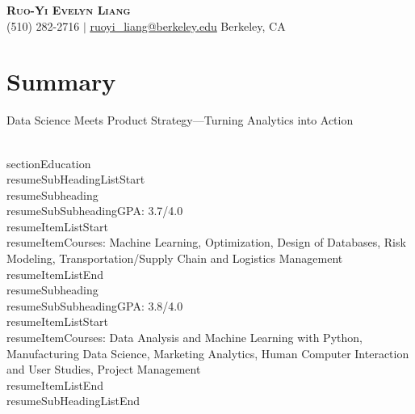 \documentclass[letterpaper,11pt]{article}
\makeatletter
\newcommand{\resumeItem}[1]{
  \item\small{
    {#1 \vspace{-2pt}}
  }
}
\newcommand{\resumeSubheading}[4]{
  \vspace{-2pt}\item
    \begin{tabular*}{0.97\textwidth}[t]{l@{\extracolsep{\fill}}r}
      \textbf{#1} & #2 \\
      \textit{\small#3} & \textit{\small #4} \\
    \end{tabular*}\vspace{-7pt}
}
\newcommand{\resumeSubSubheading}[2]{
    \item
    \begin{tabular*}{0.97\textwidth}{l@{\extracolsep{\fill}}r}
      \textit{\small#1} & \textit{\small #2} \\
    \end{tabular*}\vspace{-7pt}
}
\newcommand{\resumeSubHeadingListStart}{\begin{itemize}[leftmargin=0.15in, label={}]}
\newcommand{\resumeSubHeadingListEnd}{\end{itemize}}
\newcommand{\resumeItemListStart}{\begin{itemize}}
\newcommand{\resumeItemListEnd}{\end{itemize}\vspace{-5pt}}
\makeatother
\begin{document}
\setlength{\pdfpageheight}{11.00in}

\begin{center}
    \textbf{\Huge \scshape Ruo-Yi Evelyn Liang} \\ \vspace{1pt}
    \small (510) 282-2716 $|$ \href{mailto:ruoyi_liang@berkeley.edu}{\underline{ruoyi\_liang@berkeley.edu}}
    \small Berkeley, CA
\end{center}

\section*{Summary} %
  Data Science Meets Product Strategy—Turning Analytics into Action

\\section{Education}\n  \\resumeSubHeadingListStart\n    \\resumeSubheading{}\n    \\resumeSubSubheading{GPA: 3.7/4.0}{}\n      \\resumeItemListStart\n        \\resumeItem{Courses: Machine Learning, Optimization, Design of Databases, Risk Modeling, Transportation/Supply Chain and Logistics Management}\n      \\resumeItemListEnd\n    \\resumeSubheading{}\n    \\resumeSubSubheading{GPA: 3.8/4.0}{}\n      \\resumeItemListStart\n        \\resumeItem{Courses: Data Analysis and Machine Learning with Python, Manufacturing Data Science, Marketing Analytics, Human Computer Interaction and User Studies, Project Management}\n      \\resumeItemListEnd\n  \\resumeSubHeadingListEnd\n
\end{document}
